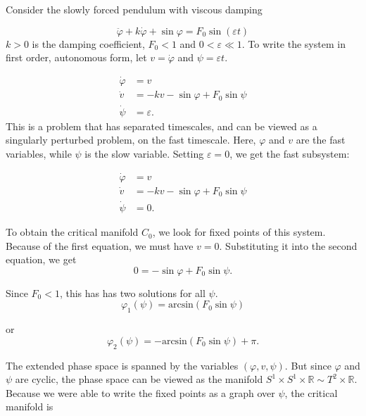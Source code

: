 \begin{solution}[9.6]
Consider the slowly forced pendulum with viscous damping

\begin{equation*}
    \label{eq1}\ddot{\varphi} + k\dot{\varphi} + \sin \varphi = F_0 \sin (\varepsilon t)
\end{equation*}
$k>0$ is the damping coefficient, $F_0<1$ and $0<\varepsilon \ll 1$. 
To write the system in first order, autonomous form, let $v = \dot{\varphi}$ and $\psi = \varepsilon t$. 

\begin{align*}
    \dot{\varphi} & = v \\
    \dot{v} & = -k v - \sin \varphi + F_0 \sin \psi \\
    \dot{\psi} &= \varepsilon.
\end{align*}
This is a problem that has separated timescales, and can be viewed as a singularly perturbed problem, on the fast timescale. Here, $\varphi$ and $v$ are the fast variables, while $\psi$ is the slow variable. Setting $\varepsilon = 0$, we get the fast subsystem:

\begin{align*}
    \dot{\varphi} & = v \\
    \dot{v} & = -k v - \sin \varphi + F_0 \sin \psi \\
    \dot{\psi} &= 0.
\end{align*}

To obtain the critical manifold $C_0$, we look for fixed points of this system. Because of the first equation, we must have $v=0$. Substituting it into the second equation, we get
\begin{equation*}
    0 = -\sin \varphi + F_0 \sin \psi.
\end{equation*}

Since $F_0<1$, this has has two solutions for all $\psi$. 
\begin{equation}
\label{root1}
    \varphi_1(\psi) = \text{arcsin}(F_0 \sin \psi)
\end{equation}

or
\begin{equation}
\label{root2}
    \varphi_2(\psi) = -\text{arcsin}(F_0 \sin \psi) + \pi.
\end{equation}

The extended phase space is spanned by the variables $(\varphi, v, \psi)$. But since $\varphi$ and $\psi$ are cyclic, the phase space can be viewed as the manifold $S^1 \times S^1 \times \mathbb{R}  \sim T^2 \times \mathbb{R}$. Because we were able to write the fixed points as a graph over $\psi$, the critical manifold is


\end{solution}
